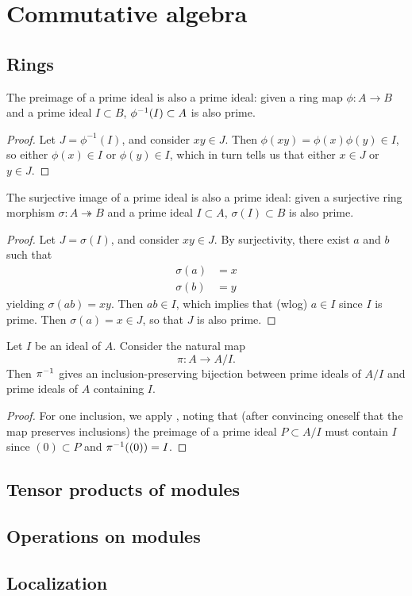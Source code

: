 \chapter{Commutative algebra}

\section{Rings}
\label{sec:rings}

\begin{prop}%
  \label{prop:preimage-of-prime-is-prime}
  The preimage of a prime ideal is also a prime ideal: given a ring map $\phi :
  A \to B$ and a prime ideal $I \subset B$, ${\phi}^{-1}(I) \subset A$ is also
  prime.
\end{prop}
\begin{proof}
  Let $J = \phi^{-1}(I)$, and consider $xy \in J$. Then $\phi(xy) =
  \phi(x)\phi(y) \in I$, so either $\phi(x) \in I$ or $\phi(y) \in I$, which in
  turn tells us that either $x \in J$ or $y \in J$.
\end{proof}

\begin{prop}%
  \label{prop:surjective-image-of-prime-is-prime}
  The surjective image of a prime ideal is also a prime ideal: given a
  surjective ring morphism $\sigma : A \twoheadrightarrow B$ and a prime ideal
  $I \subset A$, $\sigma(I) \subset B$ is also prime.
\end{prop}
\begin{proof}
  Let $J = \sigma(I)$, and consider $xy \in J$. By surjectivity, there exist $a$
  and $b$ such that
  \begin{align*}
    \sigma(a) &= x\\
    \sigma(b) &= y
  \end{align*}
  yielding $\sigma(ab) = xy$. Then $ab \in I$, which implies that (wlog) $a \in
  I$ since $I$ is prime. Then $\sigma(a) = x \in J$, so that $J$ is also prime.
\end{proof}

\begin{prop}
  Let $I$ be an ideal of $A$. Consider the natural map
  \[\pi : A \to A/I.\]
  Then ${\pi}^{-1}$ gives an inclusion-preserving bijection between prime
  ideals of $A/I$ and prime ideals of $A$ containing $I$.
\end{prop}
\begin{proof}
  For one inclusion, we apply , noting
  that (after convincing oneself that the map preserves inclusions) the preimage
  of a prime ideal $P \subset A/I$ must contain $I$ since $(0) \subset P$ and
  ${\pi}^{-1}((0)) = I$.
\end{proof}

\section{Tensor products of modules}
\label{sec:tensor-products-of-modules}

\section{Operations on modules}
\label{sec:operations-on-modules}

\section{Localization}
\label{sec:localization}